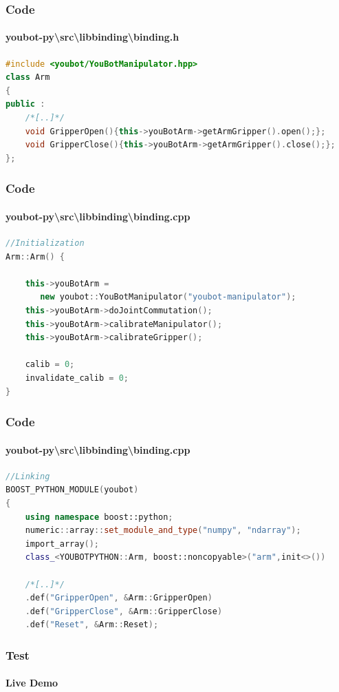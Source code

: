\documentclass{beamer}
\begin{document}
\begin{frame}[fragile]
 \frametitle{Code}
 \framesubtitle{youbot-py\textbackslash src\textbackslash libbinding\textbackslash binding.h}
\begin{lstlisting}[language=C++]
#include <youbot/YouBotManipulator.hpp>
class Arm
{
public :
	/*[..]*/
	void GripperOpen(){this->youBotArm->getArmGripper().open();};
	void GripperClose(){this->youBotArm->getArmGripper().close();};
};
\end{lstlisting}
\end{frame}

\begin{frame}[fragile]
 \frametitle{Code}
 \framesubtitle{youbot-py\textbackslash src\textbackslash libbinding\textbackslash binding.cpp}
\begin{lstlisting}[language=C++]
//Initialization
Arm::Arm() {

	this->youBotArm =
	   new youbot::YouBotManipulator("youbot-manipulator");
	this->youBotArm->doJointCommutation();
	this->youBotArm->calibrateManipulator();
	this->youBotArm->calibrateGripper();

	calib = 0;
	invalidate_calib = 0;
}
 \end{lstlisting}
\end{frame}

\begin{frame}[fragile]
 \frametitle{Code}
 \framesubtitle{youbot-py\textbackslash src\textbackslash libbinding\textbackslash binding.cpp}
\begin{lstlisting}[language=C++]
//Linking
BOOST_PYTHON_MODULE(youbot)
{
    using namespace boost::python;
    numeric::array::set_module_and_type("numpy", "ndarray"); 
    import_array();
    class_<YOUBOTPYTHON::Arm, boost::noncopyable>("arm",init<>())

	/*[..]*/
	.def("GripperOpen", &Arm::GripperOpen)
	.def("GripperClose", &Arm::GripperClose)
	.def("Reset", &Arm::Reset);
\end{lstlisting}
\end{frame}




\begin{frame}
 \frametitle{Test}
 \framesubtitle{Live Demo}
\end{frame}


%         


\end{document}
